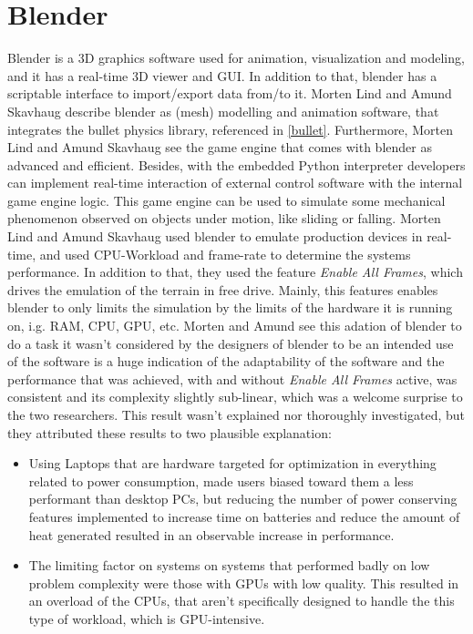 \documentclass[
	12pt, 
	a4paper, 
]{article}
\begin{document}
	\section{Blender}
	Blender is a 3D graphics software used for animation, visualization and modeling, and it has a real-time 3D viewer and GUI. In addition to that, blender has a scriptable interface to import/export data from/to it\cite{kent20153d}. Morten Lind and Amund Skavhaug describe blender as (mesh) modelling and animation software, that integrates the bullet physics library, referenced in \ref{bullet}. Furthermore, Morten Lind and Amund Skavhaug see the game engine that comes with blender as advanced and efficient. Besides, with the embedded Python interpreter developers can implement real-time interaction of external control software with the internal game engine logic. This game engine can be used to simulate some mechanical phenomenon observed on objects under motion, like sliding or falling.\cite{lind2012using}\newline
	Morten Lind and Amund Skavhaug used blender to emulate production devices in real-time, and used CPU-Workload and frame-rate to determine the systems performance. In addition to that, they used the feature \textit{Enable All Frames}, which drives the emulation of the terrain in free drive. Mainly, this features enables blender to only limits the simulation by the limits of the hardware it is running on, i.g. RAM, CPU, GPU, etc\cite{lind2012using}. Morten and Amund see this adation of blender to do a task it wasn't considered by the designers of blender to be an intended use of the software\cite{lind2012using} is a huge indication of the adaptability of the software and the performance that was achieved, with and without \textit{Enable All Frames} active, was consistent and its complexity slightly sub-linear\cite{lind2012using}, which was a welcome surprise to the two researchers. This result wasn't explained nor thoroughly investigated, but they attributed these results to two plausible explanation\cite{lind2012using}:
	\begin{itemize}
		\item Using Laptops that are hardware targeted for optimization in everything related to power consumption, made users biased toward them a less performant than desktop PCs, but reducing the number of power conserving features implemented to increase time on batteries and reduce the amount of heat generated resulted in an observable increase in performance\cite{lind2012using}.
		\item The limiting factor on systems on systems that performed badly on low problem complexity were those with GPUs with low quality. This resulted in an overload of the CPUs, that aren't specifically designed to handle the this type of workload, which is GPU-intensive\cite{lind2012using}.
	\end{itemize}
\end{document}
